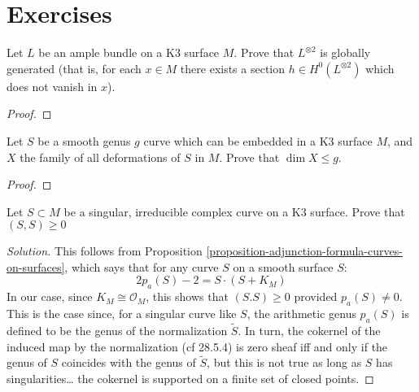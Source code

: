 \section{Exercises}
\label{section-exercises}

\begin{exercise}
\label{exercise-square-of-ample-bundle-on-K3-is-globally-generated}
Let $L$ be an ample bundle on a K3 surface $M$. Prove that $L^{\otimes 2}$ is
globally generated (that is, for each $x\in M$ there exists a section $h\in
H^{0}(L^{\otimes2})$ which does not vanish in $x$).
\end{exercise}

\begin{proof}

\end{proof}

\begin{exercise}
\label{exercise-deformation-space-of-smooth-curve-on-K3-
has-dimension-bounded-by-genus}
Let $S$ be a smooth genus $g$ curve which can be embedded in a K3 surface $M$,
and $X$ the family of all deformations of $S$ in $M$. Prove that $\dim X\leq g$.
\end{exercise}

\begin{proof}

\end{proof}

\begin{exercise}
\label{exercise-singular-irreducible-curve-on-K3-non-negative-self-intersection}
Let $S \subset M$ be a singular, irreducible complex curve on a K3 surface.
Prove that $(S,S)\geq 0$
\end{exercise}

\begin{proof}[Solution]
This follows from Proposition 
\ref{proposition-adjunction-formula-curves-on-surfaces}, which says that
for any curve $S$ on a smooth surface $S$:
$$
2p_a(S)-2=S\cdot (S+K_M)
$$
In our case, since $K_M \cong\mathcal{O}_M$, this shows that $(S.S)\geq 0$
provided $p_a(S) \neq 0$. This is the case since, for a singular curve like $S$,
the arithmetic genus $p_a(S)$ is defined to be the genus of the normalization
 $\tilde{S}$. In turn, the cokernel of the induced map by the normalization
(cf \cite{sea} 28.5.4) is zero sheaf iff and only if the genus of $S$ coincides
with the genus of $\tilde{S}$, but this is not true as long as $S$ has
singularities… the cokernel is supported on a finite set of closed points.
\end{proof}
